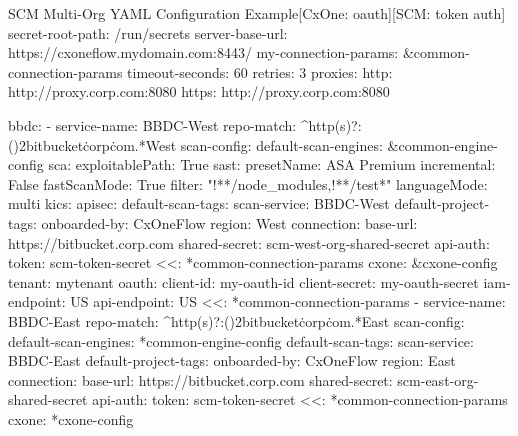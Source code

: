 \begin{code}{SCM Multi-Org YAML Configuration Example}{[CxOne: oauth]}{[SCM: token auth]}
secret-root-path: /run/secrets
server-base-url: https://cxoneflow.mydomain.com:8443/
my-connection-params: &common-connection-params
    timeout-seconds: 60
    retries: 3
    proxies:
    http: http://proxy.corp.com:8080
    https: http://proxy.corp.com:8080

bbdc:
    - service-name: BBDC-West
      repo-match: ^http(s)?:(\/){2}bitbucket\.corp\.com.*West
      scan-config: 
          default-scan-engines: &common-engine-config
              sca:
                  exploitablePath: True
              sast:
                  presetName: ASA Premium
                  incremental: False
                  fastScanMode: True
                  filter: "!**/node_modules,!**/test*"
                  languageMode: multi
              kics:
              apisec:
          default-scan-tags:
              scan-service: BBDC-West
          default-project-tags:
              onboarded-by: CxOneFlow
              region: West
      connection:
          base-url: https://bitbucket.corp.com
          shared-secret: scm-west-org-shared-secret
          api-auth:
              token: scm-token-secret
          <<: *common-connection-params
      cxone: &cxone-config
          tenant: mytenant
          oauth:
              client-id: my-oauth-id
              client-secret: my-oauth-secret
          iam-endpoint: US
          api-endpoint: US
          <<: *common-connection-params
    - service-name: BBDC-East
      repo-match: ^http(s)?:(\/){2}bitbucket\.corp\.com.*East
      scan-config: 
          default-scan-engines: *common-engine-config
          default-scan-tags:
              scan-service: BBDC-East
          default-project-tags:
              onboarded-by: CxOneFlow
              region: East
      connection:
          base-url: https://bitbucket.corp.com
          shared-secret: scm-east-org-shared-secret
          api-auth:
              token: scm-token-secret
          <<: *common-connection-params
      cxone: *cxone-config
\end{code}

